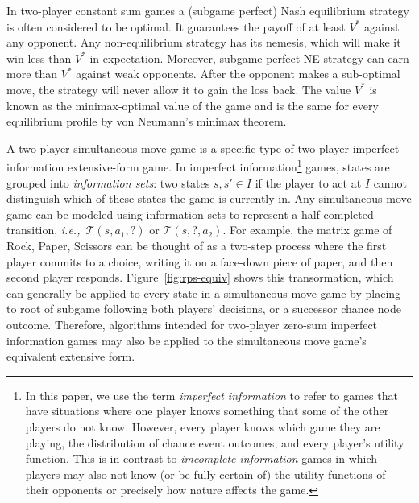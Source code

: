 \documentclass[preprint,12pt]{elsarticle}
\newcommand{\cT}{\mathcal{T}}
\newcommand{\ie}{{\it i.e.,}~}
\begin{document}
In two-player constant sum games a (subgame perfect) Nash equilibrium strategy is often considered to be optimal. It guarantees 
the payoff of at least $V^*$ against any opponent. Any non-equilibrium strategy has its nemesis, which will make it win less 
than $V^*$ in expectation. Moreover, subgame perfect NE strategy can earn more than $V^*$ against weak opponents. After the 
opponent makes a sub-optimal move, the strategy will never allow it to gain the loss back.
The value $V^*$ is known as the minimax-optimal value of the game
and is the same for every equilibrium profile by von Neumann's minimax theorem.

A two-player simultaneous move game is a specific type of two-player imperfect information extensive-form game. 
In imperfect information\footnote{In this paper, we use the term {\it imperfect information} to refer to games that have situations 
where one player knows something that some of the other players do not know. However, every player knows which game they are playing, 
the distribution of chance event outcomes, and every player's utility function. This is in contrast to 
{\it imcomplete information} games in which players may also not know (or be fully certain of) the utility functions of their opponents 
or precisely how nature affects the game.} 
games, states are grouped into {\it information sets}: two states $s, s' \in I$ if the player 
to act at $I$ cannot distinguish which of these states the game is currently in. Any simultaneous move game can be modeled 
using information sets to represent a half-completed transition, \ie $\cT(s, a_1, ?)$ or $\cT(s, ?, a_2)$. 
For example, the matrix game of Rock, Paper, Scissors can be thought of as a two-step process where the first player commits
to a choice, writing it on a face-down piece of paper, and then second player responds. Figure~\ref{fig:rps-equiv} shows this
transormation, which can generally be applied to every state in a simultaneous move game by placing to root of subgame following 
both players' decisions, or a successor chance node outcome. 
Therefore, algorithms intended for two-player zero-sum imperfect information games may also be applied to the 
simultaneous move game's equivalent extensive form. 
\end{document}
